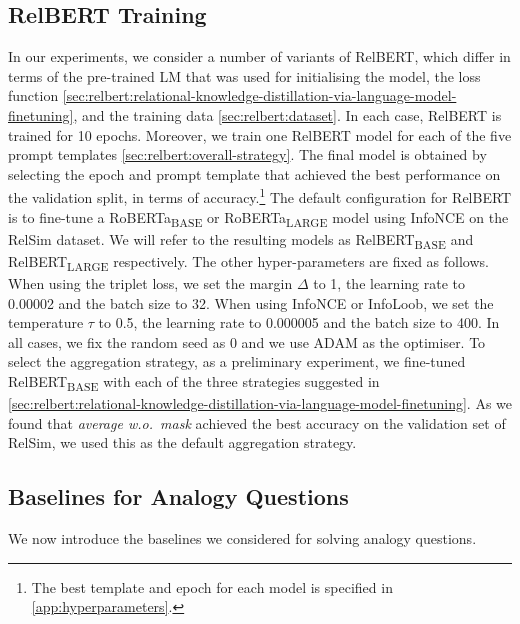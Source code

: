 \documentclass[3p]{elsarticle}
\begin{document}
{\subsection{RelBERT Training}\label{sec:relbert:relbert-training}
In our experiments, we consider a number of variants of RelBERT, which differ in terms of the pre-trained LM that was used for initialising the model, the loss function \autoref{sec:relbert:relational-knowledge-distillation-via-language-model-finetuning}, and the training data \autoref{sec:relbert:dataset}. In each case, RelBERT is trained for 10 epochs. Moreover, we train one RelBERT model for each of the five prompt templates \autoref{sec:relbert:overall-strategy}. The final model is obtained by selecting the epoch and prompt template that achieved the best performance on the validation split, in terms of accuracy.\footnote{The best template and epoch for each model is specified in \ref{app:hyperparameters}.}  The default configuration for RelBERT is to fine-tune a RoBERTa\textsubscript{BASE} or RoBERTa\textsubscript{LARGE} model using InfoNCE on the RelSim dataset. We will refer to the resulting models as RelBERT\textsubscript{BASE} and RelBERT\textsubscript{LARGE} respectively. The other hyper-parameters are fixed as follows. When using the triplet loss, we set the margin $\Delta$ to 1, the learning rate to 0.00002 and the batch size to 32. When using InfoNCE or InfoLoob, we set the temperature $\tau$ to 0.5, the learning rate to 0.000005 and the batch size to 400. In all cases, we fix the random seed as 0 and we use ADAM \cite{kingma2014adam} as the optimiser. To select the aggregation strategy, as a preliminary experiment, we fine-tuned RelBERT\textsubscript{BASE} with each of the three strategies suggested in \autoref{sec:relbert:relational-knowledge-distillation-via-language-model-finetuning}. As we found that \emph{average w.o.\ mask} achieved the best accuracy on the validation set of RelSim, we used this as the default aggregation strategy.

\subsection{Baselines for Analogy Questions}\label{sec:relbert:baseline-for-analogy-quesionts}
We now introduce the baselines we considered for solving analogy questions.

}
\end{document}
